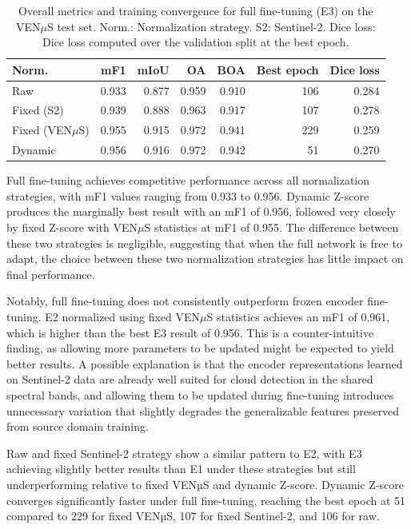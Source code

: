 \begin{table}[H]
\centering
\caption[Overall metrics and training convergence for full fine-tuning.]{Overall metrics and training convergence for full fine-tuning (E3) on the VEN$\mu$S test set. Norm.: Normalization strategy. S2: Sentinel-2. Dice loss: Dice loss computed over the validation split at the best epoch.}
\label{tab:e3_overall}
\small
\begin{tabular}{lrrrrrr}
\toprule
\textbf{Norm.} & \textbf{mF1} & \textbf{mIoU} & 
\textbf{OA} & \textbf{BOA} & 
\textbf{Best epoch} & \textbf{Dice loss} \\
\midrule
Raw               & 0.933 & 0.877 & 0.959 & 0.910 & 106 & 0.284 \\
Fixed (S2)        & 0.939 & 0.888 & 0.963 & 0.917 & 107 & 0.278 \\
Fixed (VEN$\mu$S) & 0.955 & 0.915 & 0.972 & 0.941 & 229 & 0.259 \\
Dynamic           & 0.956 & 0.916 & 0.972 & 0.942 & 51  & 0.270 \\
\bottomrule
\end{tabular}
\end{table}

Full fine-tuning achieves competitive performance across all normalization strategies, with mF1 values ranging from 0.933 to 0.956. Dynamic Z-score produces the marginally best result with an mF1 of 0.956, followed very closely by fixed Z-score with VEN$\mu$S statistics at mF1 of 0.955. The difference between these two strategies is negligible, suggesting that when the full network is free to adapt, the choice between these two normalization strategies has little impact on final performance.

Notably, full fine-tuning does not consistently outperform frozen encoder fine-tuning. E2 normalized using fixed VEN$\mu$S statistics achieves an mF1 of 0.961, which is higher than the best E3 result of 0.956. This is a counter-intuitive finding, as allowing more parameters to be updated might be expected to yield better results. A possible explanation is that the encoder representations learned on Sentinel-2 data are already well suited for cloud detection in the shared spectral bands, and allowing them to be updated during fine-tuning introduces unnecessary variation that slightly degrades the generalizable features preserved from source domain training.

Raw and fixed Sentinel-2 strategy show a similar pattern to E2, with E3 achieving slightly better results than E1 under these strategies but still underperforming relative to fixed VENµS and dynamic Z-score. Dynamic Z-score converges significantly faster under full fine-tuning, reaching the best epoch at 51 compared to 229 for fixed VENµS, 107 for fixed Sentinel-2, and 106 for raw.

